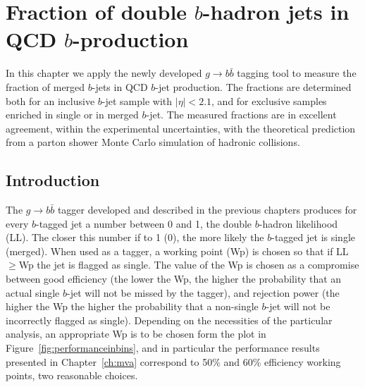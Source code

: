 %
\chapter{Fraction of double $b$-hadron jets in QCD $b$-production}\label{ch:gbbfraction}


In this chapter we apply the newly developed $g \rightarrow b\bar{b}$ tagging tool to measure the fraction of merged $b$-jets in QCD $b$-jet production. The fractions are determined both for an inclusive $b$-jet sample with $|\eta|<2.1$, and for exclusive samples enriched in single or in merged $b$-jet.
The measured fractions are in excellent agreement, within the experimental uncertainties, with the theoretical prediction from a parton shower Monte Carlo simulation of hadronic collisions.


\section{Introduction}\label{sec:FitIntro}

The $g\rightarrow b\bar{b}$ tagger developed and described in the previous chapters produces for every $b$-tagged jet a number between 0 and 1, the double $b$-hadron likelihood (LL). The closer this number if to 1 (0), the more likely the $b$-tagged jet is single (merged). When used as a tagger, a working point (Wp) is chosen so that if LL$\geq$Wp the jet is flagged as single. The value of the Wp is chosen as a compromise between good efficiency (the lower the Wp, the higher the probability that an actual single $b$-jet will not be missed by the tagger), and rejection power (the higher the Wp the higher the probability that a non-single $b$-jet will not be incorrectly flagged as single). Depending on the necessities of the particular analysis, an appropriate Wp is to be chosen form the plot in Figure~\ref{fig:performanceinbins}, and in particular the performance results presented in Chapter~\ref{ch:mva} correspond to 50\% and 60\% efficiency working points, two reasonable choices.

